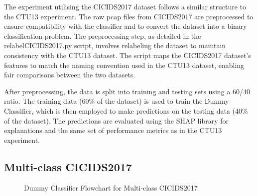 The experiment utilising the CICIDS2017 dataset follows a similar structure to the CTU13 experiment. The raw pcap files from CICIDS2017 are preprocessed to ensure compatibility with the classifier and to convert the dataset into a binary classification problem. The preprocessing step, as detailed in the relabelCICIDS2017.py script, involves relabeling the dataset to maintain consistency with the CTU13 dataset. The script maps the CICIDS2017 dataset's features to match the naming convention used in the CTU13 dataset, enabling fair comparisons between the two datasets.

After preprocessing, the data is split into training and testing sets using a 60/40 ratio. The training data (60\% of the dataset) is used to train the Dummy Classifier, which is then employed to make predictions on the testing data (40\% of the dataset). The predictions are evaluated using the SHAP library for explanations and the same set of performance metrics as in the CTU13 experiment.

\subsection{Multi-class CICIDS2017}

\begin{figure}[H]
\centering
{}
\caption{Dummy Classifier Flowchart for Multi-class CICIDS2017}\label{fig:DummyRandomFlowMultiCICIDS2017}
\end{figure}

